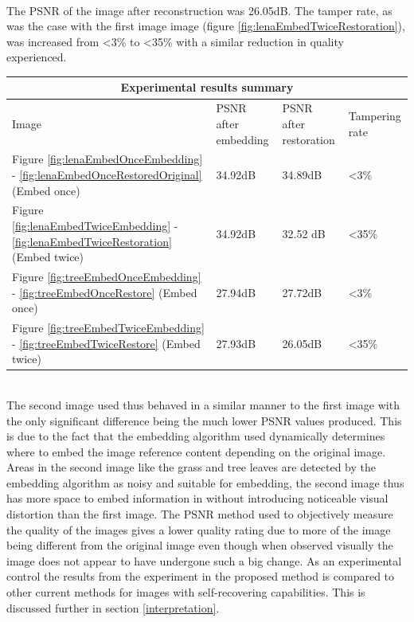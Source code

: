 \documentclass[12pt]{article}
\begin{document}
\hspace{0pt} \\
The PSNR of the image after reconstruction was 26.05dB.
The tamper rate, as was the case with the first image image (figure \ref{fig:lenaEmbedTwiceRestoration}), was increased from \textless 3\% to \textless 35\% with a similar reduction in quality experienced.
\begin{center}
  \begin{tabular}{| l | l | l | l |}
    \hline
    \multicolumn{4}{|c|}{Experimental results summary} \\
    \hline
    Image & PSNR after embedding & PSNR after restoration & Tampering rate \\ \hline
    Figure \ref{fig:lenaEmbedOnceEmbedding} - \ref{fig:lenaEmbedOnceRestoredOriginal} (Embed once) & 34.92dB & 34.89dB & \textless 3\% \\ \hline
    Figure \ref{fig:lenaEmbedTwiceEmbedding} - \ref{fig:lenaEmbedTwiceRestoration} (Embed twice) & 34.92dB & 32.52 dB & \textless 35\% \\ \hline
    Figure \ref{fig:treeEmbedOnceEmbedding} - \ref{fig:treeEmbedOnceRestore} (Embed once) & 27.94dB & 27.72dB & \textless 3\% \\ \hline
    Figure \ref{fig:treeEmbedTwiceEmbedding} - \ref{fig:treeEmbedTwiceRestore} (Embed twice) & 27.93dB & 26.05dB & \textless 35\% \\ \hline
    \hline
  \end{tabular}
\end{center}

\hspace{0pt} \\
The second image used thus behaved in a similar manner to the first image with the only significant difference being the much lower PSNR values produced.
This is due to the fact that the embedding algorithm used dynamically determines where to embed the image reference content depending on the original image.
Areas in the second image like the grass and tree leaves are detected by the embedding algorithm as noisy and suitable for embedding, the second image thus has more space to embed information in without introducing noticeable visual distortion than the first image.
The PSNR method used to objectively measure the quality of the images gives a lower quality rating due to more of the image being different from the original image even though when observed visually the image does not appear to have undergone such a big change. 
  As an experimental control the results from the experiment in the proposed method is compared to other current methods for images with self-recovering capabilities.
This is discussed further in  section \ref{interpretation}.
\end{document}
